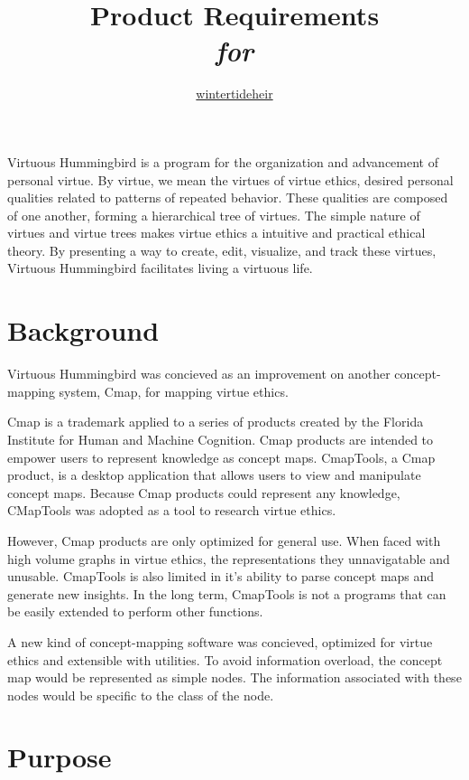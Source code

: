 \documentclass{article}
\title{Product Requirements \\ \textit{for} \\ \name{}}
\author{\href{https://github.com/wintertideheir}{wintertideheir}}
\newcommand{\name}{Virtuous Hummingbird}
\begin{document}
\maketitle

\name{} is a program for the organization and advancement of personal virtue.
By virtue, we mean the virtues of virtue ethics, desired personal qualities related to patterns of repeated behavior.
These qualities are composed of one another, forming a hierarchical tree of virtues. 
The simple nature of virtues and virtue trees makes virtue ethics a intuitive and practical ethical theory.
By presenting a way to create, edit, visualize, and track these virtues, \name{} facilitates living a virtuous life.

\tableofcontents

\section{Background}

\name{} was concieved as an improvement on another concept-mapping system, Cmap, for mapping virtue ethics.

Cmap is a trademark applied to a series of products created by the Florida Institute for Human and Machine Cognition.
Cmap products are intended to empower users to represent knowledge as concept maps.
CmapTools, a Cmap product, is a desktop application that allows users to view and manipulate concept maps.
Because Cmap products could represent any knowledge, CMapTools was adopted as a tool to research virtue ethics.

However, Cmap products are only optimized for general use.
When faced with high volume graphs in virtue ethics, the representations they unnavigatable and unusable.
CmapTools is also limited in it's ability to parse concept maps and generate new insights.
In the long term, CmapTools is not a programs that can be easily extended to perform other functions.

A new kind of concept-mapping software was concieved, optimized for virtue ethics and extensible with utilities.
To avoid information overload, the concept map would be represented as simple nodes.
The information associated with these nodes would be specific to the class of the node.

\section{Purpose}
\end{document}
